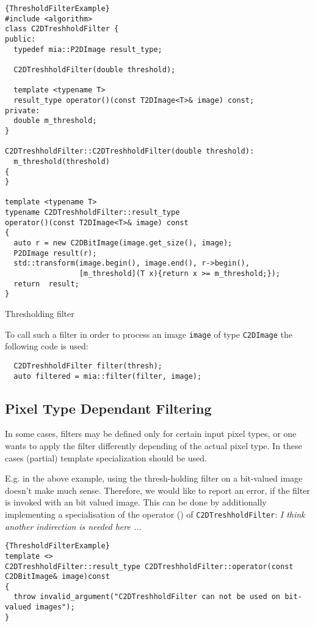 \documentclass[english, 10pt, a4paper,headsepline,openany]{scrbook}
\begin{document}
\begin{listing}
\begin{lstlisting}{ThresholdFilterExample}
#include <algorithm>
class C2DTreshholdFilter {
public: 
  typedef mia::P2DImage result_type; 
  
  C2DTreshholdFilter(double threshold); 

  template <typename T> 
  result_type operator()(const T2DImage<T>& image) const; 
private:
  double m_threshold; 
}

C2DTreshholdFilter::C2DTreshholdFilter(double threshold):
  m_threshold(threshold)
{
}

template <typename T> 
typename C2DTreshholdFilter::result_type 
operator()(const T2DImage<T>& image) const
{
  auto r = new C2DBitImage(image.get_size(), image); 
  P2DImage result(r); 
  std::transform(image.begin(), image.end(), r->begin(), 
                 [m_threshold](T x){return x >= m_threshold;});
  return  result; 
}
\end{lstlisting}
\caption{\label{list:filterthreshold}Thresholding filter}
\end{listing}


To call such a filter in order to process an image \texttt{image} of type \texttt{C2DImage} 
   the following code is used: 
\begin{lstlisting}
  C2DTreshholdFilter filter(thresh); 
  auto filtered = mia::filter(filter, image); 
\end{lstlisting}


  
\subsection{Pixel Type Dependant Filtering}
\label{sec:ptdf}

In some cases, filters may be defined only for certain input pixel types, or one wants to apply 
   the filter differently depending of the actual pixel type. 
In these cases (partial) template specialization should be used. 

E.g. in the above example, using the thresh-holding filter on a bit-valued image doesn't make much sense. 
Therefore, we would like to report an error, if the filter is invoked with an bit valued image. 
This can be done  by additionally implementing a specialisation of the 
  operator () of \texttt{C2DTreshholdFilter}: 
\emph{I think another indirection is needed here ...}
\begin{lstlisting}{ThresholdFilterExample}
template <>
C2DTreshholdFilter::result_type C2DTreshholdFilter::operator(const C2DBitImage& image)const 
{
  throw invalid_argument("C2DTreshholdFilter can not be used on bit-valued images"); 
}
\end{lstlisting}
 
\end{document}
